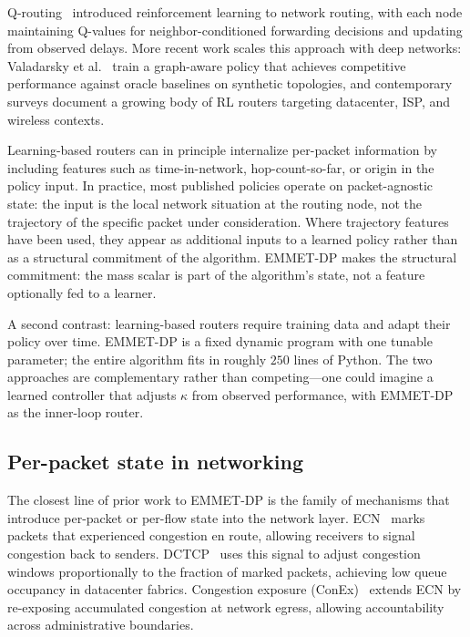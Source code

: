 Q-routing~\cite{boyan1994packet} introduced reinforcement learning
to network routing, with each node maintaining Q-values for
neighbor-conditioned forwarding decisions and updating from
observed delays. More recent work scales this approach with deep
networks: Valadarsky et al.~\cite{valadarsky2017learning} train a
graph-aware policy that achieves competitive performance against
oracle baselines on synthetic topologies, and contemporary surveys
\cite{xiao2020survey} document a growing body of RL routers
targeting datacenter, ISP, and wireless contexts.

Learning-based routers can in principle internalize per-packet
information by including features such as time-in-network,
hop-count-so-far, or origin in the policy input. In practice, most
published policies operate on packet-agnostic state: the input is
the local network situation at the routing node, not the
trajectory of the specific packet under consideration. Where
trajectory features have been used, they appear as additional
inputs to a learned policy rather than as a structural commitment
of the algorithm. EMMET-DP makes the structural commitment: the
mass scalar is part of the algorithm's state, not a feature
optionally fed to a learner.

A second contrast: learning-based routers require training data
and adapt their policy over time. EMMET-DP is a fixed dynamic
program with one tunable parameter; the entire algorithm fits in
roughly $250$ lines of Python. The two approaches are
complementary rather than competing—one could imagine a learned
controller that adjusts $\kappa$ from observed performance, with
EMMET-DP as the inner-loop router.

\subsection{Per-packet state in networking}
\label{subsec:related-perpacket}

The closest line of prior work to EMMET-DP is the family of
mechanisms that introduce per-packet or per-flow state into the
network layer. ECN~\cite{ramakrishnan2001ecn} marks packets that
experienced congestion en route, allowing receivers to signal
congestion back to senders. DCTCP~\cite{alizadeh2010dctcp} uses
this signal to adjust congestion windows proportionally to the
fraction of marked packets, achieving low queue occupancy in
datacenter fabrics. Congestion exposure
(ConEx)~\cite{briscoe2014conex} extends ECN by re-exposing
accumulated congestion at network egress, allowing accountability
across administrative boundaries.

